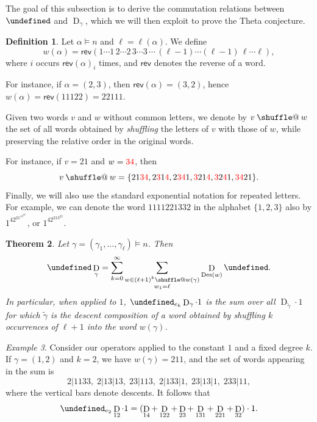 \documentclass[reqno]{amsart}
\makeatletter
\theoremstyle{plain}
\newtheorem{theorem}{Theorem}[section]
\theoremstyle{definition}
\newtheorem{definition}[theorem]{Definition}
\theoremstyle{remark}
\newtheorem{example}[theorem]{Example}
\DeclareMathOperator{\D}{D}
\DeclareMathOperator{\Des}{Des}
\let\oldTheta\Theta
\let\Theta\undefined
\DeclareMathOperator{\Theta}{\oldTheta}
\providecommand*{\shuffle}{%
  \mathbin{\mathpalette\shuffle@{}}%
}
\newcommand*{\shuffle@}[2]{%
  \sbox0{$#1\vcenter{}$}%
  \kern .15\ht0 %
  \rlap{\vrule height .25\ht0 depth 0pt width 2.5\ht0}%
  \raise.1\ht0\hbox to 2.5\ht0{%
    \vrule height 1.75\ht0 depth -.1\ht0 width .17\ht0 %
    \hfill
    \vrule height 1.75\ht0 depth -.1\ht0 width .17\ht0 %
    \hfill
    \vrule height 1.75\ht0 depth -.1\ht0 width .17\ht0 %
  }%
  \kern .15\ht0 %
}
\newcommand{\<}{\langle}
\renewcommand{\>}{\rangle}
\makeatother
\begin{document}
The goal of this subsection is to derive the commutation relations between $\Theta$ and $\D_\gamma$, which we will then exploit to prove the Theta conjecture.

\begin{definition}
    Let $\alpha \vDash n$ and $\ell = \ell(\alpha)$. We define 
    \[ w(\alpha) = \mathsf{rev}(1 \cdots 1\, 2 \cdots 2\, 3 \cdots 3\, \cdots\, (\ell-1) \cdots (\ell-1)\, \ell \cdots \ell), \]
    where $i$ occurs $\mathsf{rev}(\alpha)_i$ times, and $\mathsf{rev}$ denotes the reverse of a word.
\end{definition}

For instance, if $\alpha=(2,3)$, then $\mathsf{rev}(\alpha)=(3,2)$, hence $w(\alpha)=\mathsf{rev}(11122)=22111$.

Given two words $v$ and $w$ without common letters, we denote by $v \shuffle w$ the set of all words obtained by \emph{shuffling} the letters of $v$ with those of $w$, while preserving the relative order in the original words. 

For instance, if $v=21$ and $w=\textcolor{red}{3}\textcolor{red}{4}$, then
\[v \shuffle w = \{21\textcolor{red}{3}\textcolor{red}{4}, 2\textcolor{red}{3}1\textcolor{red}{4},2\textcolor{red}{3}\textcolor{red}{4}1, \textcolor{red}{3}21\textcolor{red}{4},\textcolor{red}{3}2\textcolor{red}{4}1,\textcolor{red}{3}\textcolor{red}{4}21\}. \]
Finally, we will also use the standard exponential notation for repeated letters. For example, we can denote the word $1111221332$ in the alphabet $\{1,2,3\}$ also by $1^42^21^13^22^1$, or $1^42^213^22$.

\begin{theorem}
    \label{thm:shuffle_theta_D}
    Let $\gamma = (\gamma_1, \dots, \gamma_\ell) \vDash n$. Then
    \[ \Theta \D_\gamma = \sum_{k=0}^\infty \sum_{\substack{w \in (\ell+1)^k \shuffle w(\gamma) \\ w_1 = \ell}} \D_{\Des(w)} \Theta. \]
    In particular, when applied to $1$, $\Theta_{e_k} \D_\gamma \cdot 1$ is the sum over all $\D_{\tilde{\gamma}} \cdot 1$ for which ${\tilde{\gamma}}$ is the descent composition of a word obtained by shuffling $k$ occurrences of $\ell+1$ into the word $w(\gamma)$.
\end{theorem}

\begin{example}
    Consider our operators applied to the constant $1$ and a fixed degree $k$. If $\gamma = (1,2)$ and $k=2$, we have $w(\gamma) = 211$, and the set of words appearing in the sum is \[ 2|1133, \; 2|13|13, \; 23|113, \; 2|133|1, \; 23|13|1, \; 233|11, \] where the vertical bars denote descents. It follows that \[ \Theta_{e_2} \D_{12} \cdot 1 = (\D_{14} + \D_{122} + \D_{23} + \D_{131} + \D_{221} + \D_{32}) \cdot 1. \]
\end{example}
\end{document}
